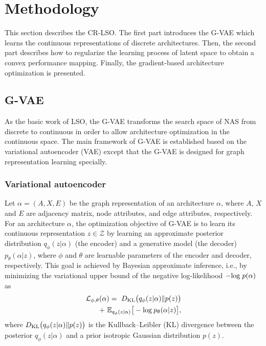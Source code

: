 \documentclass[10pt,twocolumn,letterpaper]{article}
\begin{document}
\section{Methodology}
This section describes the CR-LSO. The first part introduces the G-VAE which learns the continuous representations of discrete architectures. Then, the second part describes how to regularize the learning process of latent space to obtain a convex performance mapping. Finally, the gradient-based architecture optimization is presented.
\subsection{G-VAE}
As the basic work of LSO, the G-VAE transforms the search space of NAS from discrete to continuous in order to allow architecture optimization in the continuous space. The main framework of G-VAE is established based on the variational autoencoder (VAE) \cite{kingma2013auto, doersch2016tutorial} except that the G-VAE is designed for graph representation learning specially.

\subsubsection{Variational autoencoder}
Let $\alpha=(A, X, E)$ be the graph representation of an architecture $\alpha$, where $A$, $X$ and $E$ are adjacency matrix, node attributes, and edge attributes, respectively. For an architecture $\alpha$, the optimization objective of G-VAE is to learn its continuous representation $z\in \mathcal{Z}$ by learning an approximate posterior distribution $q_{\phi}(z|\alpha)$ (the encoder) and a generative model (the decoder) $p_{\theta}(\alpha|z)$, where $\phi$ and $\theta$ are learnable parameters of the encoder and decoder, respectively. This goal is achieved by Bayesian approximate inference, i.e., by minimizing the variational upper bound of the negative log-likelihood $-{\rm log} \; p(\alpha)$ as 
\begin{align}
	\label{eq:vae_loss}
	\begin{split}
		\mathcal{L}_{\phi, \theta}(\alpha) =   \ D_{\rm KL} \big( q_{\phi}(z|\alpha) \Vert p(z)\big) \\
		 + \ \mathbb{E}_{q_{\phi}(z|\alpha)} \big[ -{\rm log} \: p_{\theta}(\alpha|z) \big],
	\end{split}
\end{align}
where $D_{\rm KL} \big( q_{\phi}(z|\alpha) \Vert p(z)\big)$ is the Kullback–Leibler (KL) divergence between the posterior $q_{\phi}(z|\alpha)$ and a prior isotropic Gaussian distribution $p(z)$. 
\end{document}
